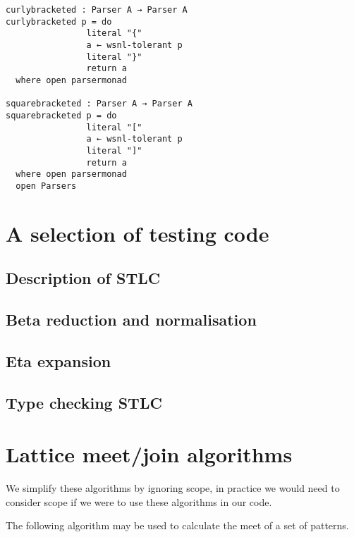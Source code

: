 \begin{appendices}
\begin{verbatim}
curlybracketed : Parser A → Parser A
curlybracketed p = do
                literal "{"
                a ← wsnl-tolerant p
                literal "}"
                return a
  where open parsermonad

squarebracketed : Parser A → Parser A
squarebracketed p = do
                literal "["
                a ← wsnl-tolerant p
                literal "]"
                return a
  where open parsermonad
  open Parsers
\end{verbatim}

\section{A selection of testing code}
\label{appendix-tests}

\subsection{Description of STLC}


\subsection{Beta reduction and normalisation}


\subsection{Eta expansion}


\subsection{Type checking STLC}

\clearpage
\section{Lattice meet/join algorithms}
\label{appendix-joinalgorithms}

We simplify these algorithms by ignoring scope, in practice we would
need to consider scope if we were to use these algorithms in our code.

The following algorithm may be used to calculate the meet of a set
of patterns.


\end{appendices}
